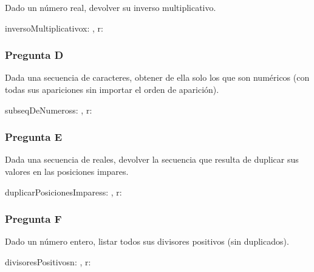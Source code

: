 Dado un número real, devolver su inverso multiplicativo.

\begin{proc}{inversoMultiplicativo}{\In x: \float, \Out r: \float}{}
\end{proc}

\subsubsection{Pregunta D}

Dada una secuencia de caracteres, obtener de ella solo los que son numéricos (con todas sus apariciones sin importar el orden de aparición).

\begin{proc}{subseqDeNumeros}{\In s: , \Out r: }{}
\end{proc}

\subsubsection{Pregunta E}

Dada una secuencia de reales, devolver la secuencia que resulta de duplicar sus valores en las posiciones impares.

\begin{proc}{duplicarPosicionesImpares}{\In s: \TLista{\float}, \Out r: \TLista{\float}}{}
\end{proc}

\subsubsection{Pregunta F}

Dado un número entero, listar todos sus divisores positivos (sin duplicados).

\begin{proc}{divisoresPositivos}{\In n: \ent, \Out r: \TLista{\ent}}{}
\end{proc}


